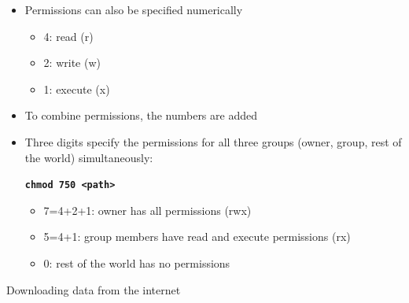 \documentclass[aspectratio=1610]{beamer}
\newcommand\curtitle{}
\newcommand\command[1]{\alert{\textbf{\texttt{#1}}}}
\begin{document}

\begin{frame}[c]{\curtitle}
    \begin{itemize}[<+->]\setlength\itemsep{1em}
        \item Permissions can also be specified numerically
            \begin{itemize}[<.->]
                \item 4: read (r)
                \item 2: write (w)
                \item 1: execute (x)
            \end{itemize}
        \item To combine permissions, the numbers are added
        \item Three digits specify the permissions for all three groups (owner, group, rest of the
            world) simultaneously:\medskip

            \command{chmod 750 <path>}
            \begin{itemize}[<.->]
                \item 7=4+2+1: owner has all permissions (rwx)
                \item 5=4+1: group members have read and execute permissions (rx)
                \item 0: rest of the world has no permissions
            \end{itemize}
    \end{itemize}
\end{frame}

\renewcommand\curtitle{Downloading data from the internet}

\begin{frame}[c]
    \Huge \curtitle
\end{frame}

\end{document}
